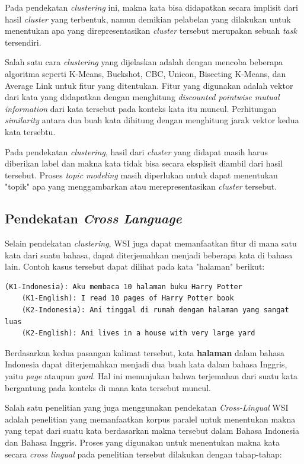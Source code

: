 	Pada pendekatan \textit{clustering} ini, makna kata bisa didapatkan secara implisit dari hasil \textit{cluster} yang terbentuk, namun demikian pelabelan yang dilakukan untuk menentukan apa yang direpresentasikan \textit{cluster} tersebut merupakan sebuah \textit{task} tersendiri.
	
	Salah satu cara \textit{clustering} yang dijelaskan \citep{pantel2002discovering} adalah dengan mencoba beberapa algoritma seperti K-Means, Buckshot, CBC, Unicon, Bisecting K-Means, dan Average Link untuk fitur yang ditentukan. Fitur yang digunakan adalah vektor dari kata yang didapatkan dengan menghitung \textit{discounted pointwise mutual information} dari kata tersebut pada konteks kata itu muncul. Perhitungan \textit{similarity} antara dua buah kata dihitung dengan menghitung jarak vektor kedua kata tersebtu.
	
	Pada pendekatan \textit{clustering}, hasil dari \textit{cluster} yang didapat masih harus diberikan label dan makna kata tidak bisa secara eksplisit diambil dari hasil tersebut. Proses \textit{topic modeling} masih diperlukan untuk dapat menentukan "topik" apa yang menggambarkan atau merepresentasikan \textit{cluster} tersebut. 
	
	\subsection{Pendekatan \textit{Cross Language}}
	Selain pendekatan \textit{clustering}, WSI juga dapat memanfaatkan fitur di mana satu kata dari suatu bahasa, dapat diterjemahkan menjadi beberapa kata di bahasa lain. Contoh kasus tersebut dapat dilihat pada kata "halaman" berikut:

	\begin{lstlisting}[backgroundcolor = \color{white}]
	(K1-Indonesia): Aku membaca 10 halaman buku Harry Potter
	(K1-English): I read 10 pages of Harry Potter book
	(K2-Indonesia): Ani tinggal di rumah dengan halaman yang sangat luas
	(K2-English): Ani lives in a house with very large yard
	\end{lstlisting}
	
	Berdasarkan kedua pasangan kalimat tersebut, kata \textbf{halaman} dalam bahasa Indonesia dapat diterjemahkan menjadi dua buah kata dalam bahasa Inggris, yaitu \textit{page} ataupun \textit{yard}. Hal ini menunjukan bahwa terjemahan dari suatu kata bergantung pada konteks di mana kata tersebut muncul.
	
	Salah satu penelitian yang juga menggunakan pendekatan \textit{Cross-Lingual} WSI adalah penelitian \citep{septiantri2013wsd} yang memanfaatkan korpus paralel untuk menentukan makna yang tepat dari suatu kata berdasarkan makna tersebut dalam Bahasa Indonesia dan Bahasa Inggris. Proses yang digunakan untuk menentukan makna kata secara \textit{cross lingual} pada penelitian tersebut dilakukan dengan tahap-tahap:
	
